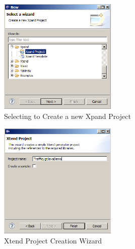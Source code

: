 \begin{figure}[h!]
\center
\includegraphics[width=0.5\textwidth]{./Pictures/Screenshot5}
\caption{\label{fig:screenshot5} Selecting to Create a new Xpand Project}
\end{figure}

\begin{figure}[h!]
\center
\includegraphics[width=0.5\textwidth]{./Pictures/Screenshot6}
\caption{\label{fig:screenshot6} Xtend Project Creation Wizard}
\end{figure}

\clearpage
